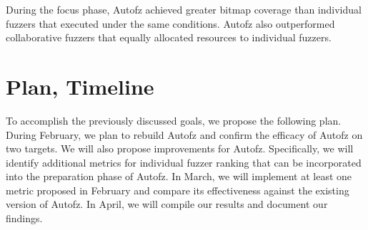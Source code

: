 During the focus phase, Autofz achieved greater bitmap coverage than individual 
fuzzers that executed under the same conditions. Autofz also outperformed 
collaborative fuzzers that equally allocated resources to individual fuzzers. 
\cite{Fu}

\section{Plan, Timeline}
To accomplish the previously discussed goals, we propose the following plan. 
During February, we plan to rebuild Autofz and confirm the efficacy of Autofz 
on two targets. We will also propose improvements for Autofz. Specifically, we 
will identify additional metrics for individual fuzzer ranking that can be 
incorporated into the preparation phase of Autofz. In March, we will implement 
at least one metric proposed in February and compare its effectiveness against 
the existing version of Autofz. In April, we will compile our results and document 
our findings.






